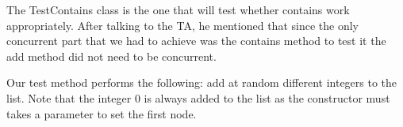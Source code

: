 \documentclass[11pt,letterpaper]{exam}
\begin{document}
\begin{questions}
		\question 
			The TestContains class is the one that will test whether contains work appropriately. After talking to the TA, he mentioned that since the only concurrent part that we had to achieve was the contains method to test it the add method did not need to be concurrent.
			
			Our test method performs the following: add at random different integers to the list. Note that the integer 0 is always added to the list as the constructor must takes a parameter to set the first node.
	\end{questions}
\end{document}
